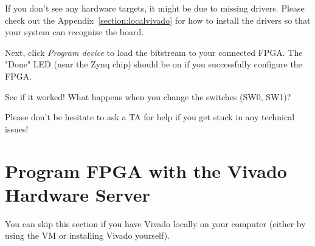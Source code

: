 \documentclass[11pt]{article}
\begin{document}
\begin{center}
\end{center}

If you don't see any hardware targets, it might be due to missing drivers. Please check out the Appendix~\ref{section:localvivado} for how to install the drivers so that your system can recognize the board.

Next, click \emph{Program device} to load the bitstream to your connected FPGA. The "Done" LED (near the Zynq chip) should be on if you successfully configure the FPGA.

\begin{center}
\end{center}

See if it worked! What happens when you change the switches (SW0, SW1)?

Please don't be hesitate to ask a TA for help if you get stuck in any technical issues!

\section{Program FPGA with the Vivado Hardware Server}
\label{section:hw_server}

You can skip this section if you have Vivado locally on your computer (either by using the VM or installing Vivado yourself).
\end{document}
